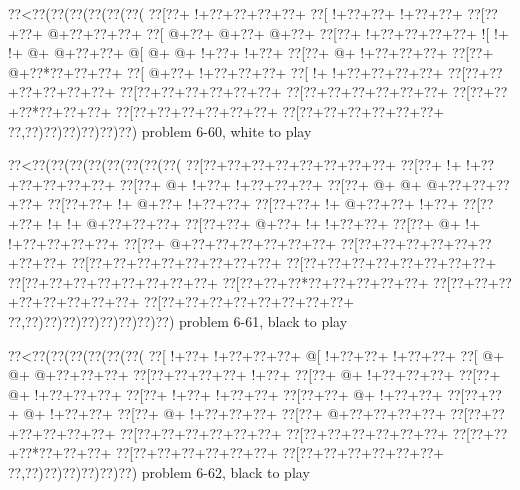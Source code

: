 \vbox{\vbox{\goo
\0??<\0??(\0??(\0??(\0??(\0??(\0??(
\0??[\0??+\- !+\0??+\0??+\0??+\0??+
\0??[\- !+\0??+\0??+\- !+\0??+\0??+
\0??[\0??+\0??+\- @+\0??+\0??+\0??+
\0??[\- @+\0??+\- @+\0??+\- @+\0??+
\0??[\0??+\- !+\0??+\0??+\0??+\0??+
\- ![\- !+\- !+\- @+\- @+\0??+\0??+
\- @[\- @+\- @+\- !+\0??+\- !+\0??+
\0??[\0??+\- @+\- !+\0??+\0??+\0??+
\0??[\0??+\- @+\0??*\0??+\0??+\0??+
\0??[\- @+\0??+\- !+\0??+\0??+\0??+
\0??[\- !+\- !+\0??+\0??+\0??+\0??+
\0??[\0??+\0??+\0??+\0??+\0??+\0??+
\0??[\0??+\0??+\0??+\0??+\0??+\0??+
\0??[\0??+\0??+\0??+\0??+\0??+\0??+
\0??[\0??+\0??+\0??*\0??+\0??+\0??+
\0??[\0??+\0??+\0??+\0??+\0??+\0??+
\0??[\0??+\0??+\0??+\0??+\0??+\0??+
\0??,\0??)\0??)\0??)\0??)\0??)\0??)
}
\hfil problem 6-60, white to play\hfil\break
}

\vbox{\vbox{\goo
\0??<\0??(\0??(\0??(\0??(\0??(\0??(\0??(\0??(
\0??[\0??+\0??+\0??+\0??+\0??+\0??+\0??+\0??+
\0??[\0??+\- !+\- !+\0??+\0??+\0??+\0??+\0??+
\0??[\0??+\- @+\- !+\0??+\- !+\0??+\0??+\0??+
\0??[\0??+\- @+\- @+\- @+\0??+\0??+\0??+\0??+
\0??[\0??+\0??+\- !+\- @+\0??+\- !+\0??+\0??+
\0??[\0??+\0??+\- !+\- @+\0??+\0??+\- !+\0??+
\0??[\0??+\0??+\- !+\- !+\- @+\0??+\0??+\0??+
\0??[\0??+\0??+\- @+\0??+\- !+\- !+\0??+\0??+
\0??[\0??+\- @+\- !+\- !+\0??+\0??+\0??+\0??+
\0??[\0??+\- @+\0??+\0??+\0??+\0??+\0??+\0??+
\0??[\0??+\0??+\0??+\0??+\0??+\0??+\0??+\0??+
\0??[\0??+\0??+\0??+\0??+\0??+\0??+\0??+\0??+
\0??[\0??+\0??+\0??+\0??+\0??+\0??+\0??+\0??+
\0??[\0??+\0??+\0??+\0??+\0??+\0??+\0??+\0??+
\0??[\0??+\0??+\0??*\0??+\0??+\0??+\0??+\0??+
\0??[\0??+\0??+\0??+\0??+\0??+\0??+\0??+\0??+
\0??[\0??+\0??+\0??+\0??+\0??+\0??+\0??+\0??+
\0??,\0??)\0??)\0??)\0??)\0??)\0??)\0??)\0??)
}
\hfil problem 6-61, black to play\hfil\break
}

\vbox{\vbox{\goo
\0??<\0??(\0??(\0??(\0??(\0??(\0??(
\0??[\- !+\0??+\- !+\0??+\0??+\0??+
\- @[\- !+\0??+\0??+\- !+\0??+\0??+
\0??[\- @+\- @+\- @+\0??+\0??+\0??+
\0??[\0??+\0??+\0??+\0??+\- !+\0??+
\0??[\0??+\- @+\- !+\0??+\0??+\0??+
\0??[\0??+\- @+\- !+\0??+\0??+\0??+
\0??[\0??+\- !+\0??+\- !+\0??+\0??+
\0??[\0??+\0??+\- @+\- !+\0??+\0??+
\0??[\0??+\0??+\- @+\- !+\0??+\0??+
\0??[\0??+\- @+\- !+\0??+\0??+\0??+
\0??[\0??+\- @+\0??+\0??+\0??+\0??+
\0??[\0??+\0??+\0??+\0??+\0??+\0??+
\0??[\0??+\0??+\0??+\0??+\0??+\0??+
\0??[\0??+\0??+\0??+\0??+\0??+\0??+
\0??[\0??+\0??+\0??*\0??+\0??+\0??+
\0??[\0??+\0??+\0??+\0??+\0??+\0??+
\0??[\0??+\0??+\0??+\0??+\0??+\0??+
\0??,\0??)\0??)\0??)\0??)\0??)\0??)
}
\hfil problem 6-62, black to play\hfil\break
}

